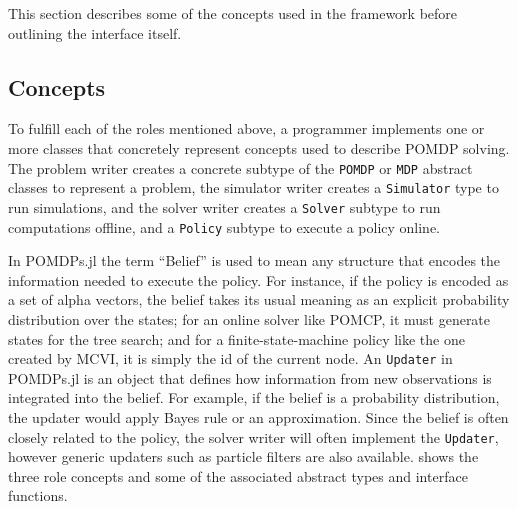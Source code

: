 
This section describes some of the concepts used in the framework before outlining the interface itself.

\subsection{Concepts} \label{sec:concepts}

To fulfill each of the roles mentioned above, a programmer implements one or more classes that concretely represent concepts used to describe POMDP solving.
The problem writer creates a concrete subtype of the \texttt{POMDP} or \texttt{MDP} abstract classes to represent a problem, the simulator writer creates a \texttt{Simulator} type to run simulations, and the solver writer creates a \texttt{Solver} subtype to run computations offline, and a \texttt{Policy} subtype to execute a policy online.

In POMDPs.jl the term ``Belief'' is used to mean any structure that encodes the information needed to execute the policy.
For instance, if the policy is encoded as a set of alpha vectors, the belief takes its usual meaning as an explicit probability distribution over the states; for an online solver like POMCP, it must generate states for the tree search; and for a finite-state-machine policy like the one created by MCVI, it is simply the id of the current node.
An \texttt{Updater} in POMDPs.jl is an object that defines how information from new observations is integrated into the belief.
For example, if the belief is a probability distribution, the updater would apply Bayes rule or an approximation.
Since the belief is often closely related to the policy, the solver writer will often implement the \texttt{Updater}, however generic updaters such as particle filters are also available.
 shows the three role concepts and some of the associated abstract types and interface functions.

